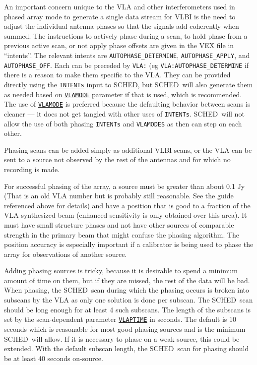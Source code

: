 \documentclass{report}
\newcommand{\sched}{{\sc SCHED}}
\newcommand{\schedb}{{\sc SCHED~}}
\begin{document}
An important concern unique to the VLA and other interferometers used
in phased array mode to generate a single data stream for VLBI is the
need to adjust the individual antenna phases so that the signals add
coherently when summed.  The instructions to actively phase during a
scan, to hold phase from a previous active scan, or not apply phase
offsets are given in the VEX file in ``intents''.  The relevant
intents are {\tt AUTOPHASE\_DETERMINE}, {\tt AUTOPHASE\_APPLY}, and
{\tt AUTOPHASE\_OFF}.  Each can be preceded by {\tt VLA:} (eg 
{\tt VLA:AUTOPHASE\_DETERMINE} if there is a reason to make them 
specific to the VLA.   They can be provided directly using the
{\hyperref[MP:INTENTs]{{\tt INTENTs}}} input to \sched, but \schedb will
also generate them as needed based on 
{\hyperref[MP:VLAMODE]{{\tt VLAMODE}}}
parameter if that is used, which is recommended.  The use of 
{\hyperref[MP:VLAMODE]{{\tt VLAMODE}}} is preferred because
the defaulting behavior between scans is cleaner --- it does not get
tangled with other uses of {\tt INTENTs}.  \schedb will not allow the
use of both phasing {\tt INTENTs} and {\tt VLAMODES} as then can step
on each other.

Phasing scans can be added simply as additional VLBI scans, or the VLA
can be sent to a source not observed by the rest of the antennas and
for which no recording is made.

For successful phasing of the array, a source must be greater than
about 0.1 Jy (That is an old VLA number but is probably still
reasonable.  See the guide referenced above for details) and have a
position that is good to a fraction of the VLA synthesized beam
(enhanced sensitivity is only obtained over this area).  It must have
small structure phases and not have other sources of comparable
strength in the primary beam that might confuse the phasing algorithm.
The position accuracy is especially important if a calibrator is being
used to phase the array for observations of another source.  

Adding phasing sources is tricky, because it is desirable to spend a
minimum amount of time on them, but if they are missed, the rest of
the data will be bad.  When phasing, the \schedb scan during which the
phasing occurs is broken into subscans by the VLA as only one solution
is done per subscan.  The \schedb scan should be long enough for at
least 4 such subscans.  The length of the subscans is set by the
scan-dependent parameter 
{\hyperref[MP:VLAPTIME]{{\tt VLAPTIME}}} in
seconds.  The default is 10 seconds which is reasonable for most good
phasing sources and is the minimum \schedb will allow.  If it is
necessary to phase on a weak source, this could be extended.  With the
default subscan length, the \schedb scan for phasing should be at
least 40 seconds on-source.
\end{document}
